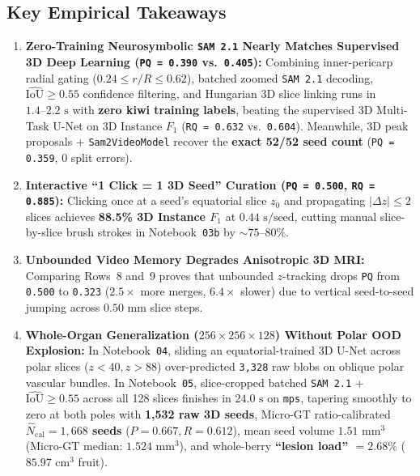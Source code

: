 \documentclass[10.5pt,a4paper]{article}
\begin{document}
\subsection{Key Empirical Takeaways}

\begin{enumerate}
    \item \textbf{Zero-Training Neurosymbolic \texttt{SAM 2.1} Nearly Matches Supervised 3D Deep Learning (\texttt{PQ = 0.390} vs.\ \texttt{0.405}):} Combining inner-pericarp radial gating ($0.24 \le r/R \le 0.62$), batched zoomed \texttt{SAM 2.1} decoding, $\widehat{\text{IoU}} \ge 0.55$ confidence filtering, and Hungarian 3D slice linking runs in \textbf{$1.4\text{--}2.2\text{ s}$} with \textbf{zero kiwi training labels}, beating the supervised 3D Multi-Task U-Net on 3D Instance $F_1$ (\texttt{RQ = 0.632} vs.\ \texttt{0.604}). Meanwhile, 3D peak proposals + \texttt{Sam2VideoModel} recover the \textbf{exact 52/52 seed count} (\texttt{PQ = 0.359}, 0 split errors).
    \item \textbf{Interactive ``1 Click = 1 3D Seed'' Curation (\texttt{PQ = 0.500}, \texttt{RQ = 0.885}):} Clicking once at a seed's equatorial slice $z_0$ and propagating $\lvert\Delta z\rvert \le 2$ slices achieves \textbf{88.5\% 3D Instance $F_1$} at $0.44\text{ s/seed}$, cutting manual slice-by-slice brush strokes in Notebook~\texttt{03b} by $\sim 75\text{--}80\%$.
    \item \textbf{Unbounded Video Memory Degrades Anisotropic 3D MRI:} Comparing Rows~8 and~9 proves that unbounded $z$-tracking drops \texttt{PQ} from \texttt{0.500} to \texttt{0.323} ($2.5\times$ more merges, $6.4\times$ slower) due to vertical seed-to-seed jumping across $0.50\text{ mm}$ slice steps.
    \item \textbf{Whole-Organ Generalization ($256 \times 256 \times 128$) Without Polar OOD Explosion:} In Notebook~\texttt{04}, sliding an equatorial-trained 3D U-Net across polar slices ($z < 40, z > 88$) over-predicted \texttt{3,328} raw blobs on oblique polar vascular bundles. In Notebook~\texttt{05}, slice-cropped batched \texttt{SAM 2.1} + $\widehat{\text{IoU}} \ge 0.55$ across all 128 slices finishes in \textbf{$24.0\text{ s}$} on \texttt{mps}, tapering smoothly to zero at both poles with \textbf{1,532 raw 3D seeds}, Micro-GT ratio-calibrated \textbf{$\widehat{N}_{\text{cal}} = 1{,}668$ seeds} ($P = 0.667, R = 0.612$), mean seed volume \textbf{$1.51\text{ mm}^3$} (Micro-GT median: $1.524\text{ mm}^3$), and whole-berry \textbf{``lesion load'' $= 2.68\%$} ($85.97\text{ cm}^3$ fruit).
\end{enumerate}
\end{document}
